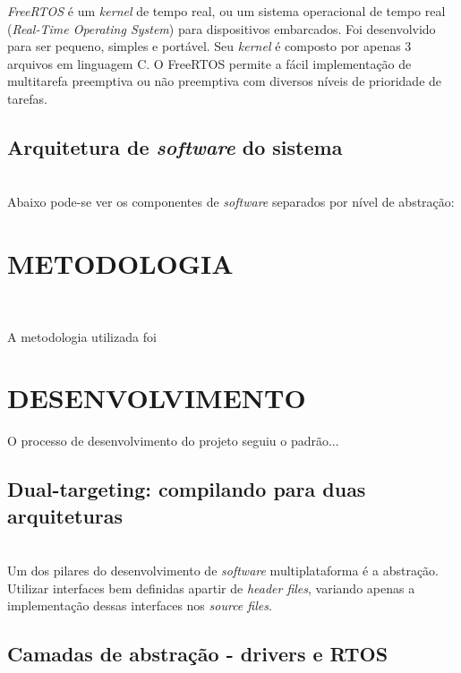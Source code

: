 \documentclass[times, twoside, watermark]{artigo}
\begin{document}
\textit{FreeRTOS} é um \textit{kernel} de tempo real, 
ou um sistema operacional de tempo real (\textit{Real-Time Operating System}) 
para dispositivos embarcados. Foi desenvolvido para ser pequeno, simples e portável. 
Seu \textit{kernel} é composto por apenas 3 arquivos em linguagem C. 
O FreeRTOS permite a fácil implementação de multitarefa preemptiva 
ou não preemptiva com diversos níveis de prioridade de tarefas\cite{zhu2016understanding}.


\subsection{Arquitetura de \textit{software} do sistema}\hfill\\
Abaixo pode-se ver os componentes de \textit{software} separados por nível de abstração:


\section*{METODOLOGIA}\hfill\

A metodologia utilizada foi


\section*{DESENVOLVIMENTO}

\setcounter{section}{-1}
O processo de desenvolvimento do projeto seguiu o padrão...

\subsection{Dual-targeting: compilando para duas arquiteturas}\hfill\\

Um dos pilares do desenvolvimento de \textit{software} multiplataforma é a abstração.
Utilizar interfaces bem definidas apartir de \textit{header files}, variando apenas
a implementação dessas interfaces nos \textit{source files}.

\subsection{Camadas de abstração - drivers e RTOS}\hfill\\
\end{document}
